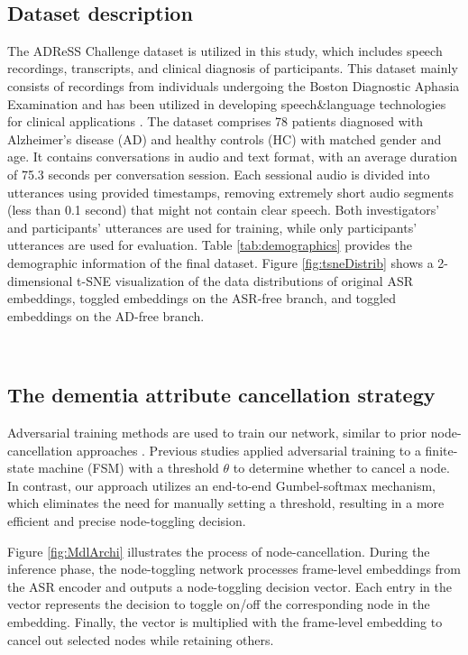 \
\subsection{Dataset description}

The ADReSS Challenge dataset \cite{luz2020alzheimer} is utilized in this study, which includes speech recordings, transcripts, and clinical diagnosis of participants. This dataset mainly consists of recordings from individuals undergoing the Boston Diagnostic Aphasia Examination and has been utilized in developing speech\&language technologies for clinical applications \cite{ilias2023detecting, wang2022conformer, li2022gpt, farzana2022you}. The dataset comprises 78 patients diagnosed with Alzheimer's disease (AD) and healthy controls (HC) with matched gender and age. It contains conversations in audio and text format, with an average duration of 75.3 seconds per conversation session. Each sessional audio is divided into utterances using provided timestamps, removing extremely short audio segments (less than 0.1 second) that might not contain clear speech. Both investigators' and participants' utterances are used for training, while only participants' utterances are used for evaluation. Table \ref{tab:demographics} provides the demographic information of the final dataset. Figure \ref{fig:tsneDistrib} shows a 2-dimensional t-SNE visualization of the data distributions of original ASR embeddings, toggled embeddings on the ASR-free branch, and toggled embeddings on the AD-free branch.

\
\subsection{The dementia attribute cancellation strategy}

\label{ssec:strategy}

Adversarial training methods are used to train our network, similar to prior node-cancellation approaches \cite{huang2022attention}. Previous studies applied adversarial training to a finite-state machine (FSM) with a threshold $\theta$ to determine whether to cancel a node. In contrast, our approach utilizes an end-to-end Gumbel-softmax mechanism, which eliminates the need for manually setting a threshold, resulting in a more efficient and precise node-toggling decision.

Figure \ref{fig:MdlArchi} illustrates the process of node-cancellation. During the inference phase, the node-toggling network processes frame-level embeddings from the ASR encoder and outputs a node-toggling decision vector. Each entry in the vector represents the decision to toggle on/off the corresponding node in the embedding. Finally, the vector is multiplied with the frame-level embedding to cancel out selected nodes while retaining others.

